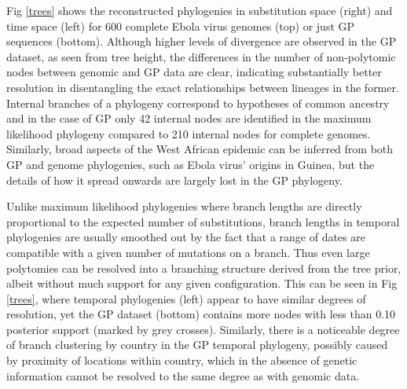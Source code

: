\documentclass[11pt,oneside,letterpaper]{article}
\begin{document}
Fig \ref{trees} shows the reconstructed phylogenies in substitution space (right) and time space (left) for 600 complete Ebola virus genomes (top) or just GP sequences (bottom).
Although higher levels of divergence are observed in the GP dataset, as seen from tree height, the differences in the number of non-polytomic nodes between genomic and GP data are clear, indicating substantially better resolution in disentangling the exact relationships between lineages in the former.
Internal branches of a phylogeny correspond to hypotheses of common ancestry and in the case of GP only 42 internal nodes are identified in the maximum likelihood phylogeny compared to 210 internal nodes for complete genomes.
Similarly, broad aspects of the West African epidemic can be inferred from both GP and genome phylogenies, such as Ebola virus' origins in Guinea, but the details of how it spread onwards are largely lost in the GP phylogeny.

Unlike maximum likelihood phylogenies where branch lengths are directly proportional to the expected number of substitutions, branch lengths in temporal phylogenies are usually smoothed out by the fact that a range of dates are compatible with a given number of mutations on a branch.
Thus even large polytomies can be resolved into a branching structure derived from the tree prior, albeit without much support for any given configuration.
This can be seen in Fig \ref{trees}, where temporal phylogenies (left) appear to have similar degrees of resolution, yet the GP dataset (bottom) contains more nodes with less than 0.10 posterior support (marked by grey crosses).
Similarly, there is a noticeable degree of branch clustering by country in the GP temporal phylogeny, possibly caused by proximity of locations within country, which in the absence of genetic information cannot be resolved to the same degree as with genomic data.
\end{document}
